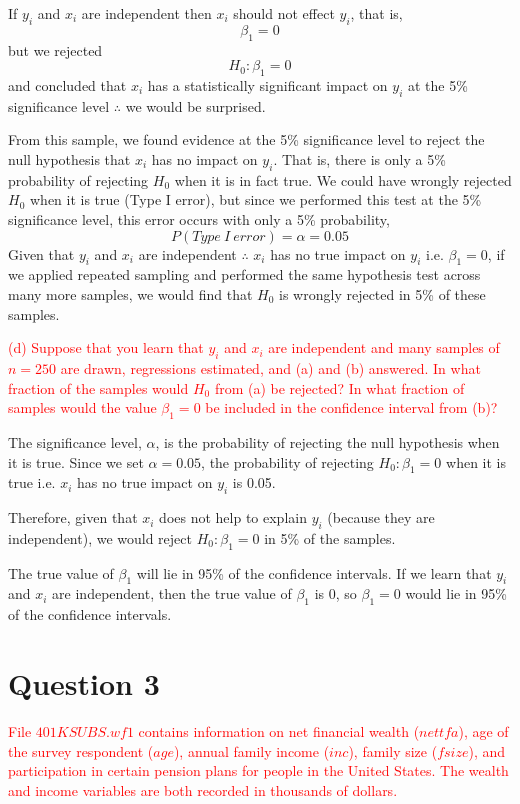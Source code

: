 \documentclass[12pt]{report}
\begin{document}
\noindent If $y_i$ and $x_i$ are independent then $x_i$ should not effect $y_i$, that is, $$\beta_1 = 0$$ but we rejected $$H_0: \beta_1 = 0$$ and concluded that $x_i$ has a statistically significant impact on $y_i$ at the 5\% significance level $\therefore$ we would be surprised.

\noindent From this sample, we found evidence at the 5\% significance level to reject the null hypothesis that $x_i$ has no impact on $y_i$. That is, there is only a 5\% probability of rejecting $H_0$ when it is in fact true. We could have wrongly rejected $H_0$ when it is true (Type I error), but since we performed this test at the 5\% significance level, this error occurs with only a 5\% probability, $$P(Type\ I\ error) = \alpha = 0.05$$ Given that $y_i$ and $x_i$ are independent $\therefore$ $x_i$ has no true impact on $y_i$ i.e. $\beta_1 = 0$, if we applied repeated sampling and performed the same hypothesis test across many more samples, we would find that $H_0$ is wrongly rejected in 5\% of these samples.

\noindent \textcolor{red}{(d) Suppose that you learn that $y_i$ and $x_i$ are independent and many samples of $n=250$ are drawn, regressions estimated, and (a) and (b) answered. In what fraction of the samples would $H_0$ from (a) be rejected? In what fraction of samples would the value $\beta_1 = 0$ be included in the confidence interval from (b)?}

\noindent The significance level, $\alpha$, is the probability of rejecting the null hypothesis when it is true. Since we set $\alpha = 0.05$, the probability of rejecting $H_0: \beta_1=0$ when it is true i.e. $x_i$ has no true impact on $y_i$ is 0.05.

\noindent Therefore, given that $x_i$ does not help to explain $y_i$ (because they are independent), we would reject $H_0: \beta_1=0$ in 5\% of the samples.

\noindent The true value of $\beta_1$ will lie in 95\% of the confidence intervals. If we learn that $y_i$ and $x_i$ are independent, then the true value of $\beta_1$ is $0$, so $\beta_1 = 0$ would lie in 95\% of the confidence intervals.

\newpage
\section*{Question 3}
\noindent \textcolor{red}{File $401KSUBS.wf1$ contains information on net financial wealth ($nettfa$), age of the survey respondent ($age$), annual family income ($inc$), family size ($fsize$), and participation in certain pension plans for people in the United States. The wealth and income variables are both recorded in thousands of dollars.}
\end{document}
